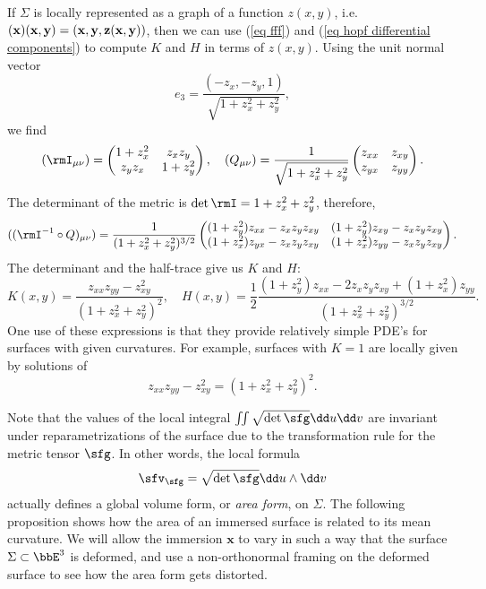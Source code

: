 \begin{rem}
    If $\Sigma$ is locally represented as a graph of a function $z(x,y)$, i.e.\ $\bf(x)(x,y)=(x,y,z(x,y))$, then we can use (\ref{eq fff}) and (\ref{eq hopf differential components}) to compute $K$ and $H$ in terms of $z(x,y)$. Using the unit normal vector 
    \[e_3=\frac{(-z_x,-z_y,1)}{\sqrt{1+z_x^2+z_y^2}},\]
    we find
    \[(\rmI_{\mu\nu})= \begin{pmatrix}
        1+z_x^2 & z_xz_y\\
        z_y z_x & 1+z_y^2
    \end{pmatrix},\quad 
    (Q_{\mu\nu})=
    \frac{1}{\sqrt{1+z_x^2+z_y^2}}
    \begin{pmatrix}
        z_{xx} & z_{xy}\\
        z_{yx} & z_{yy}
    \end{pmatrix}.\]
    The determinant of the metric is $\det\rmI=1+z_x^2+z_y^2$, therefore,
    \[((\rmI^{-1}\circ Q)_{\mu\nu})=
    \frac{1}{(1+z_x^2+z_y^2)^{3/2}}
    \begin{pmatrix}
        (1+z_y^2)z_{xx}-z_xz_yz_{xy} & (1+z_y^2)z_{xy}-z_xz_yz_{xy}\\
        (1+z_x^2)z_{yx}-z_xz_yz_{xy} & (1+z_x^2)z_{yy}-z_xz_yz_{xy}
    \end{pmatrix}.
    \]
    The determinant and the half-trace give us $K$ and $H$:
    \[K(x,y)=\frac{z_{xx}z_{yy}-z_{xy}^2}{(1+z_x^2+z_y^2)^2},\quad 
    H(x,y)=\frac{1}{2}\frac{(1+z_y^2)z_{xx}-2z_xz_yz_{xy}+(1+z_x^2)z_{yy}}{(1+z_x^2+z_y^2)^{3/2}}.\label{eq local formulas for K and H}
    \]
    One use of these expressions is that they provide relatively simple PDE's for surfaces with given curvatures. For example, surfaces with $K=1$ are locally given by solutions of 
    \[z_{xx}z_{yy}-z_{xy}^2=(1+z_x^2+z_y^2)^2.\label{eq 1.4 Ivey}\]
\end{rem}


Note that the values of the local integral $\iint \sqrt{\det \sfg}\dd u\dd v$ are invariant under reparametrizations of the surface due to the transformation rule for the metric tensor $\sfg$. In other words, the local formula 
\[\sfv_{\sfg}=\sqrt{\det\sfg}\dd u\wedge\dd v\]
actually defines a global volume form, or \emph{area form}, on $\Sigma$. The following proposition shows how the area of an immersed surface is related to its mean curvature. We will allow the immersion $\bm{x}$ to vary in such a way that the surface $\Sigma\subset\bbE^3$ is deformed, and use a non-orthonormal framing on the deformed surface to see how the area form gets distorted.

